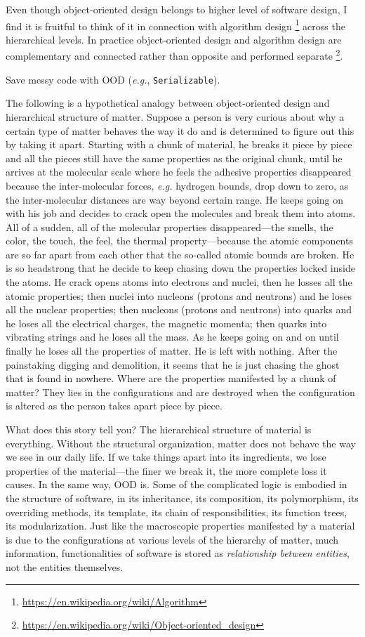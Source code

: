 \documentclass[oneside,11pt]{book}
\theoremstyle{definition}
\theoremstyle{remark}
\newcommand{\code}[1]{\mbox{\lstinline{#1}}}
\begin{document}
Even though object-oriented design belongs to higher level of software design, I find it is
fruitful to think of it in connection with algorithm design
\footnote{\url{https://en.wikipedia.org/wiki/Algorithm}} across the hierarchical levels.
In practice object-oriented design and algorithm design are complementary and connected
rather than opposite and performed separate
\footnote{\url{https://en.wikipedia.org/wiki/Object-oriented_design}}.

Save messy code with OOD (\textit{e.g.}, \code{Serializable}).

The following is a hypothetical analogy between object-oriented design and hierarchical structure
of matter.
Suppose a person is very curious about why a certain type of matter behaves the way it do and is
determined to figure out this by taking it apart.
Starting with a chunk of material, he breaks it piece by piece and all the pieces still have the
same properties as the original chunk, until he arrives at the molecular scale where he
feels the adhesive properties disappeared because the inter-molecular forces, \textit{e.g.}
hydrogen bounds, drop down to zero, as the inter-molecular distances are way beyond certain
range.
He keeps going on with his job and decides to crack open the molecules and break them into atoms.
All of a sudden, all of the molecular properties disappeared---the smells, the color, the touch,
the feel, the thermal property---because the atomic components are so far apart from each
other that the so-called atomic bounds are broken.
He is so headstrong that he decide to keep chasing down the properties locked inside the atoms.
He crack opens atoms into electrons and nuclei, then he losses all the atomic properties;
then nuclei into nucleons (protons and neutrons) and he loses all the nuclear properties;
then nucleons (protons and neutrons) into quarks and he loses all the electrical charges, the
magnetic momenta;
then quarks into vibrating strings and he loses all the mass.
As he keeps going on and on until finally he loses all the properties of matter.
He is left with nothing.
After the painstaking digging and demolition, it seems that he is just chasing the
ghost that is found in nowhere.
Where are the properties manifested by a chunk of matter?
They lies in the configurations and are destroyed when the configuration is altered as the person
takes apart piece by piece.

What does this story tell you?
The hierarchical structure of material is everything.
Without the structural organization, matter does not behave the way we see in our daily life.
If we take things apart into its ingredients, we lose properties of the material---the finer we
break it, the more complete loss it causes.
In the same way, OOD is.
Some of the complicated logic is embodied in the structure of software, in its inheritance, its
composition, its polymorphism, its overriding methods, its template, its chain of
responsibilities, its function trees, its modularization.
Just like the macroscopic properties manifested by a material is due to the configurations at
various levels of the hierarchy of matter, much information, functionalities of software is stored
as \emph{relationship between entities}, not the entities themselves.
\end{document}

